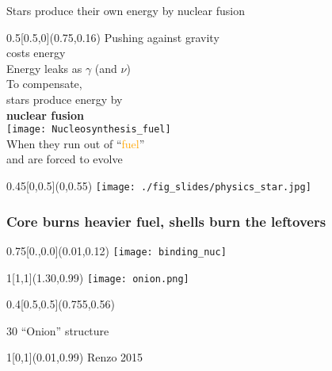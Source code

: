\documentclass[xcolor=dvipsnames,professionalfonts, aspectratio=169]{beamer}
\begin{document}
\begin{frame}{\textcolor{whiteish}{Stars produce their own energy by nuclear fusion}}

      \begin{textblock}{0.5}[0.5,0](0.75,0.16)
        \centering
        \textcolor{whiteish}{Pushing against gravity \\
          costs energy}\\[10pt]
        \textcolor{whiteish}{Energy leaks as $\gamma$ (and $\nu$)\\[10pt]
          To compensate,\\
          stars produce energy by\\
          \textbf{nuclear fusion}\\[10pt]
          \texttt{[image: Nucleosynthesis\_fuel]}\\
          When they run out of ``\textcolor{Orange}{fuel}'' \\
          and are forced to evolve}
      \end{textblock}

    \begin{textblock}{0.45}[0,0.5](0,0.55)
      \texttt{[image: ./fig\_slides/physics\_star.jpg]}
    \end{textblock}
\end{frame}
\egroup


\begin{frame}[c]
  \frametitle{Core burns heavier fuel, shells burn the leftovers}
  \begin{textblock}{0.75}[0.,0.0](0.01,0.12)
    \texttt{[image: binding\_nuc]}
  \end{textblock}

  \begin{textblock}{1}[1,1](1.30,0.99)
    \texttt{[image: onion.png]}
  \end{textblock}

  \begin{textblock}{0.4}[0.5,0.5](0.755,0.56)
    \begin{rotate}{30}
      \centering
      ``Onion'' structure
    \end{rotate}
  \end{textblock}

  \begin{textblock}{1}[0,1](0.01,0.99)
    \textcolor{gray!50}{\tiny Renzo 2015}\hfill\,
  \end{textblock}
\end{frame}
\end{document}
